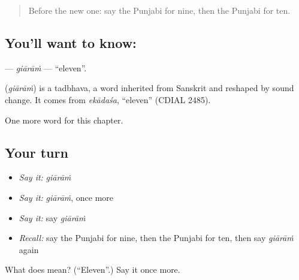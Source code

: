 \begin{quote}
Before the new one: say the Punjabi for nine, then the Punjabi for ten.
\end{quote}

\subsection*{You'll want to know: }
\textbf{} — \emph{giārāṁ} — \textquotedblleft{}eleven\textquotedblright{}.

\begin{cousinweb}
\textbf{} (\emph{giārāṁ}) is a tadbhava, a word inherited from Sanskrit and reshaped by sound change. It comes from \emph{ekādaśa}, \textquotedblleft{}eleven\textquotedblright{} (CDIAL 2485).
\end{cousinweb}

\begin{grammarlens}[title={What you've built}]
One more word for this chapter.
\end{grammarlens}

\subsection*{Your turn}
\begin{itemize}
\raggedright
  \item \emph{Say it:} \emph{giārāṁ}
  \item \emph{Say it:} \emph{giārāṁ}, once more
  \item \emph{Say it:} say \emph{giārāṁ}
  \item \emph{Recall:} say the Punjabi for nine, then the Punjabi for ten, then say \emph{giārāṁ} again
\end{itemize}

\begin{tcolorbox}[breakable,colback=teal!4,colframe=teal!35!black,title={Before you move on}]
What does  mean? (\textquotedblleft{}Eleven\textquotedblright{}.) Say it once more.
\end{tcolorbox}
